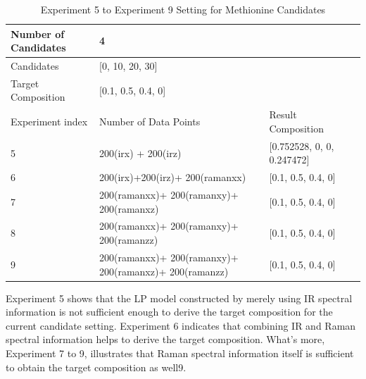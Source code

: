 \begin{table}\tiny \label{tab:4.2}
\begin{center}
\begin{tabular}{| l | l | l | l }
\hline
Number of Candidates & \multicolumn{2}{l|}{4} \\ \hline
Candidates & \multicolumn{2}{l|}{[0, 10, 20, 30]} \\ \hline
Target Composition & \multicolumn{2}{l|}{[0.1, 0.5, 0.4, 0]} \\ \hline
Experiment index & Number of Data Points & Result Composition \\ \hline
5 & 200(irx) + 200(irz) & [0.752528, 0, 0, 0.247472]  \\ \hline
6 & 200(irx)+200(irz)+ 200(ramanxx) & [0.1, 0.5, 0.4, 0] \\ \hline
7 & 200(ramanxx)+ 200(ramanxy)+ 200(ramanxz) & [0.1, 0.5, 0.4, 0] \\ \hline
8 & 200(ramanxx)+ 200(ramanxy)+ 200(ramanzz) & [0.1, 0.5, 0.4, 0] \\ \hline
9 & 200(ramanxx)+ 200(ramanxy)+ 200(ramanxz)+ 200(ramanzz)   & [0.1, 0.5, 0.4, 0] \\ \hline

\end{tabular} 
\end{center}
\caption{Experiment 5 to Experiment 9 Setting for Methionine Candidates}
\end{table}	

Experiment 5 shows that the LP model constructed by merely using IR spectral information is not sufficient enough to derive the target composition for the current candidate setting. Experiment 6 indicates that combining IR and Raman spectral information helps to derive the target composition. What's more, Experiment  7 to 9, illustrates that Raman spectral information itself is sufficient to obtain the target composition as well9. \\



